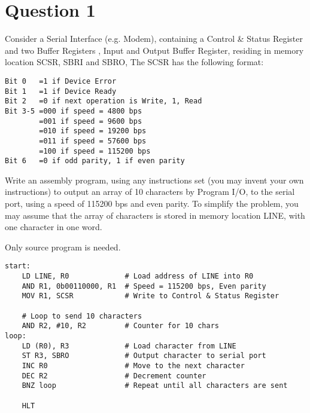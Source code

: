 \documentclass{article}
\begin{document}
\newcommand{\documentcourse}{COMP2120}
\newcommand{\documentnumber}{5}





\section*{Question 1}
Consider a Serial Interface (e.g. Modem), containing a Control \& Status Register and two Buffer Registers , Input and Output Buffer Register, residing in memory location SCSR, SBRI and SBRO, The SCSR has the following format:
\begin{verbatim}
Bit 0   =1 if Device Error
Bit 1   =1 if Device Ready
Bit 2   =0 if next operation is Write, 1, Read
Bit 3-5 =000 if speed = 4800 bps
        =001 if speed = 9600 bps
        =010 if speed = 19200 bps
        =011 if speed = 57600 bps
        =100 if speed = 115200 bps
Bit 6   =0 if odd parity, 1 if even parity
\end{verbatim}


Write an assembly program, using any instructions set (you may invent your own instructions) to output an array of 10 characters by Program I/O, to the serial port, using a speed of 115200 bps and even parity. To simplify the problem, you may assume that the array of characters is stored in memory location LINE, with one character in one word.

Only source program is needed.

\begin{verbatim}
start:
    LD LINE, R0             # Load address of LINE into R0
    AND R1, 0b00110000, R1  # Speed = 115200 bps, Even parity
    MOV R1, SCSR            # Write to Control & Status Register

    # Loop to send 10 characters
    AND R2, #10, R2         # Counter for 10 chars
loop:
    LD (R0), R3             # Load character from LINE
    ST R3, SBRO             # Output character to serial port
    INC R0                  # Move to the next character
    DEC R2                  # Decrement counter
    BNZ loop                # Repeat until all characters are sent

    HLT         
\end{verbatim}
\end{document}
